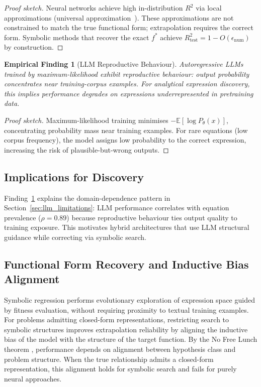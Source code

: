 \documentclass[twoside,11pt]{article}
\newcommand{\Rsq}{R^{2}}
\newcommand{\Rtest}{R^{2}_{\mathrm{test}}}
\newtheorem{finding}{Empirical Finding}
\begin{document}
\begin{proof}[Proof sketch]
Neural networks achieve high in-distribution $\Rsq$ via local approximations (universal approximation~\citep{hornik1989multilayer}). These approximations are not constrained to match the true functional form; extrapolation requires the correct form. Symbolic methods that recover the exact $f^*$ achieve $\Rtest = 1 - O(\epsilon_{\text{num}})$ by construction.
\end{proof}

\begin{finding}[LLM Reproductive Behaviour]
\label{thm:llm_reproductive}
Autoregressive LLMs trained by maximum-likelihood exhibit reproductive behaviour: output probability concentrates near training-corpus examples. For analytical expression discovery, this implies performance degrades on expressions underrepresented in pretraining data.
\end{finding}

\begin{proof}[Proof sketch]
Maximum-likelihood training minimises $-\mathbb{E}[\log P_\theta(x)]$, concentrating probability mass near training examples. For rare equations (low corpus frequency), the model assigns low probability to the correct expression, increasing the risk of plausible-but-wrong outputs.
\end{proof}

\subsection{Implications for Discovery}\label{subsec:implications-for-discovery}
\label{sec:theory_implications}

Finding~\ref{thm:llm_reproductive} explains the domain-dependence pattern in Section~\ref{sec:llm_limitations}: LLM performance correlates with equation prevalence ($\rho = 0.89$) because reproductive behaviour ties output quality to training exposure. This motivates hybrid architectures that use LLM structural guidance while correcting via symbolic search.

\subsection{Functional Form Recovery and Inductive Bias Alignment}\label{subsec:functional-form-recovery-and-inductive-b}
\label{sec:theory_recovery}

Symbolic regression performs evolutionary exploration of expression space guided by fitness evaluation, without requiring proximity to textual training examples. For problems admitting closed-form representations, restricting search to symbolic structures improves extrapolation reliability by aligning the inductive bias of the model with the structure of the target function. By the No Free Lunch theorem \citep{wolpert1997no}, performance depends on alignment between hypothesis class and problem structure. When the true relationship admits a closed-form representation, this alignment holds for symbolic search and fails for purely neural approaches.
\end{document}
